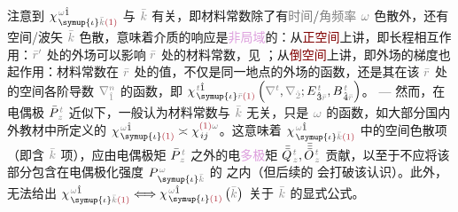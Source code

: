 注意到 $\chi^{\;\! \mathcolor{gray}{\omega} \hat{1}}_{\;\! \symup{\iota} \mathcolor{gray}{\bar{k}} \textcolor{Maroon}{(1)}}$ 与 $\mathcolor{gray}{\bar{k}}$ 有关，即材料常数除了有\textcolor{gray}{时间}/\textcolor{gray}{角频率} $\mathcolor{gray}{\omega}$ \textcolor{NavyBlue}{色散}外，还有空间/\textcolor{PineGreen}{波矢} $\mathcolor{gray}{\bar{k}}$ \textcolor{NavyBlue}{色散}，意味着介质的响应是\textcolor{Plum}{非局域}的：从\textcolor{Maroon}{正空间}上讲，即长程相互作用：$\mathcolor{gray}{\bar{r}'}$ 处的外场可以影响 $\mathcolor{gray}{\bar{r}}$ 处的材料常数，见 ；从\textcolor{Maroon}{倒空间}上讲，即外场的梯度也起作用：材料常数在 $\mathcolor{gray}{\bar{r}}$ 处的值，不仅是同一地点的外场的函数，还是其在该 $\mathcolor{gray}{\bar{r}}$ 处的空间各阶导数 $\mathcolor{gray}{\nabla^n_{\hat{1}}}$ 的函数，即 $\chi^{\;\! \mathcolor{gray}{t} \hat{1}}_{\;\! \symup{\iota} \mathcolor{gray}{\bar{r}} \textcolor{Maroon}{(1)}} \left( \mathcolor{gray}{\nabla^t}, \mathcolor{gray}{\nabla_{\hat{2}}} ; E^{\;\!\mathcolor{gray}{t}}_{\;\! \hat{3}\mathcolor{gray}{\bar{r}}}, B^{\;\!\mathcolor{gray}{t}}_{\;\! \hat{4}\mathcolor{gray}{\bar{r}}} \right)$。 ---  然而，在电偶极 $\bar{P}^{\;\!\mathcolor{gray}{t}}_{\;\!\mathcolor{gray}{z}}$ 近似下，一般认为材料常数与 $\mathcolor{gray}{\bar{k}}$ 无关，只是 $\mathcolor{gray}{\omega}$ 的函数，如大部分国内外教材中所定义的 $\chi^{\;\! \mathcolor{gray}{\omega} \hat{1}}_{\;\! \symup{\iota} \textcolor{Maroon}{(1)}} \asymp \chi^{ \textcolor{Maroon}{(1)} \mathcolor{gray}{\omega}}_{\;\! ij}$。这意味着 $\chi^{\;\! \mathcolor{gray}{\omega} \hat{1}}_{\;\! \symup{\iota} \mathcolor{gray}{\bar{k}} \textcolor{Maroon}{(1)}}$ 中的空间\textcolor{NavyBlue}{色散}项（即含 $\mathcolor{gray}{\bar{k}}$ 项），应由电偶极矩 $\bar{P}^{\;\!\mathcolor{gray}{t}}_{\;\!\mathcolor{gray}{z}}$ 之外的电\textcolor{Plum}{多极}矩 $\bar{\bar{Q}}^{\;\!\mathcolor{gray}{t}}_{\;\!\mathcolor{gray}{z}},\bar{\bar{\bar{O}}}^{\;\!\mathcolor{gray}{t}}_{\;\!\mathcolor{gray}{z}}$ 贡献\cite{shenNonlinearOpticalSusceptibilities2001}，以至于不应将该部分包含在电偶极化强度 $P^{\;\!\mathcolor{gray}{\omega}}_{\;\! \symup{\iota}\mathcolor{gray}{\bar{k}}}$ 的  之内（但后续的  会打破该认识）。此外， 无法给出 $\chi^{\;\! \mathcolor{gray}{\omega} \hat{1}}_{\;\! \symup{\iota} \mathcolor{gray}{\bar{k}} \textcolor{Maroon}{(1)}} \Longleftrightarrow \chi^{\;\! \mathcolor{gray}{\omega} \hat{1}}_{\;\! \symup{\iota} \textcolor{Maroon}{(1)}} \left( \mathcolor{gray}{\bar{k}} \right)$ 关于 $\mathcolor{gray}{\bar{k}}$ 的显式公式。

